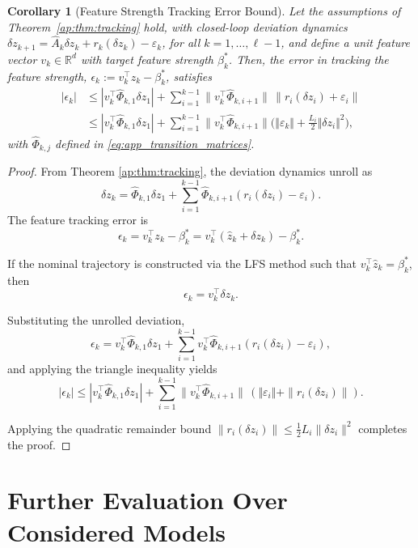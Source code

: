 \documentclass{article}
\theoremstyle{plain}
\newtheorem{corollary}[theorem]{Corollary}
\theoremstyle{definition}
\theoremstyle{remark}
\begin{document}
\begin{corollary}[Feature Strength Tracking Error Bound]
Let the assumptions of Theorem~\ref{ap:thm:tracking} hold, with closed-loop deviation dynamics $\delta z_{k+1} = \hat A_k \delta z_k + r_k(\delta z_k) - \varepsilon_k$, for all $k = 1,\dots,\ell-1$, and define a unit feature vector $v_k \in \mathbb{R}^d$ with target feature strength $\beta_k^*$. Then, the error in tracking the feature strength, $\epsilon_k := v_k^\top z_k - \beta_k^*$, satisfies
\begin{subequations}\label{eq:feature_tracking_corollary}
\begin{align}
    |\epsilon_k| &\le |v_k^\top \hat\Phi_{k,1} \delta z_1| + \sum_{i=1}^{k-1} \|v_k^\top \hat\Phi_{k,i+1}\| \, \|r_i(\delta z_i ) + \varepsilon_i\|\\
 &\le |v_k^\top \hat\Phi_{k,1} \delta z_1| + \sum_{i=1}^{k-1} \|v_k^\top \hat\Phi_{k,i+1}\| \Big( \Vert \varepsilon_k \Vert + \frac{L_i}{2} \Vert \delta z_i\Vert^2\Big),
\end{align}
\end{subequations}
with $\hat\Phi_{k,j}$ defined in \eqref{eq:app_transition_matrices}.
\end{corollary}

\begin{proof}
From Theorem \ref{ap:thm:tracking}, the deviation dynamics unroll as
\[
\delta z_k = \hat\Phi_{k,1} \delta z_1 + \sum_{i=1}^{k-1} \hat\Phi_{k,i+1} (r_i(\delta z_i) - \varepsilon_i).
\]
The feature tracking error is
\[
\epsilon_k = v_k^\top z_k - \beta_k^* = v_k^\top (\hat z_k + \delta z_k) - \beta_k^*.
\]

If the nominal trajectory is constructed via the LFS method such that $v_k^\top \hat z_k = \beta_k^*$, then
\[
\epsilon_k = v_k^\top \delta z_k.
\]

Substituting the unrolled deviation,
\[
\epsilon_k = v_k^\top \hat\Phi_{k,1} \delta z_1 + \sum_{i=1}^{k-1} v_k^\top \hat\Phi_{k,i+1} (r_i(\delta z_i) - \varepsilon_i),
\]
and applying the triangle inequality yields
\[
|\epsilon_k| \le |v_k^\top \hat\Phi_{k,1} \delta z_1| + \sum_{i=1}^{k-1} \|v_k^\top \hat\Phi_{k,i+1}\| \, (\Vert \varepsilon_i\Vert +\|r_i(\delta z_i)\|).
\]

Applying the quadratic remainder bound
$\|r_i(\delta z_i)\| \le \tfrac12 L_i \|\delta z_i\|^2$ completes the proof.
\end{proof}

\section{Further Evaluation Over Considered Models}\label{ap:experiments}
\end{document}
